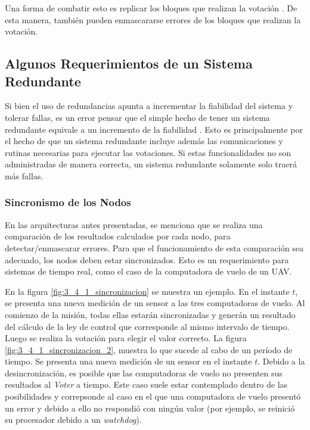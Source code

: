 Una forma de combatir esto es replicar los bloques que realizan la votación \cite{nelson1990fault}. De esta manera, también pueden enmascararse errores de los bloques que realizan la votación.

\subsection{Algunos Requerimientos de un Sistema Redundante}

Si bien el uso de redundancias apunta a incrementar la fiabilidad del sistema y tolerar fallas, es un error pensar que el simple hecho de tener un sistema redundante equivale a un incremento de la fiabilidad \cite{lala1994architectural}. Esto es principalmente por el hecho de que un sistema redundante incluye además las comunicaciones y rutinas necesarias para ejecutar las votaciones. Si estas funcionalidades no son administradas de manera correcta, un sistema redundante solamente solo traerá más fallas.

\subsubsection{Sincronismo de los Nodos}

En las arquitecturas antes presentadas, se menciona que se realiza una comparación de los resultados calculados por cada nodo, para detectar/enmascarar errores. Para que el funcionamiento de esta comparación sea adecuado, los nodos deben estar sincronizados. Esto es un requerimiento para sistemas de tiempo real, como el caso de la computadora de vuelo de un UAV.

En la figura \ref{fig:3_4_1_sincronizacion} se muestra un ejemplo. En el instante $t$, se presenta una nueva medición de un sensor a las tres computadoras de vuelo. Al comienzo de la misión, todas ellas estarán sincronizadas y generán un resultado del cálculo de la ley de control que corresponde al mismo intervalo de tiempo. Luego se realiza la votación para elegir el valor correcto. La figura \ref{fig:3_4_1_sincronizacion_2}, muestra lo que sucede al cabo de un período de tiempo. Se presenta una nueva medición de un sensor en el instante $t$. Debido a la desincronización, es posible que las computadoras de vuelo no presenten sus resultados al \textit{Voter} a tiempo. Este caso suele estar contemplado dentro de las posibilidades y correpsonde al caso en el que una computadora de vuelo presentó un error y debido a ello no respondió con ningún valor (por ejemplo, se reinició su procesador debido a un \textit{watchdog}).

